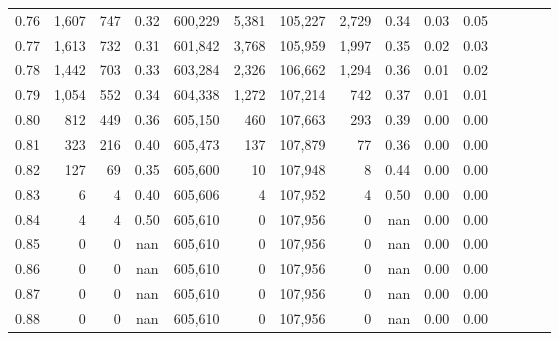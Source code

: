 \begin{tabular}{rrrcrrrrrrrrrrr}
0.76 &   1,607 &    747 &                                       0.32 &  600,229 &    5,381 &  105,227 &    2,729 &  0.34 &  0.03 &                         0.05 \\
0.77 &   1,613 &    732 &                                       0.31 &  601,842 &    3,768 &  105,959 &    1,997 &  0.35 &  0.02 &                         0.03 \\
0.78 &   1,442 &    703 &                                       0.33 &  603,284 &    2,326 &  106,662 &    1,294 &  0.36 &  0.01 &                         0.02 \\
0.79 &   1,054 &    552 &                                       0.34 &  604,338 &    1,272 &  107,214 &      742 &  0.37 &  0.01 &                         0.01 \\
0.80 &     812 &    449 &                                       0.36 &  605,150 &      460 &  107,663 &      293 &  0.39 &  0.00 &                         0.00 \\
0.81 &     323 &    216 &                                       0.40 &  605,473 &      137 &  107,879 &       77 &  0.36 &  0.00 &                         0.00 \\
0.82 &     127 &     69 &                                       0.35 &  605,600 &       10 &  107,948 &        8 &  0.44 &  0.00 &                         0.00 \\
0.83 &       6 &      4 &                                       0.40 &  605,606 &        4 &  107,952 &        4 &  0.50 &  0.00 &                         0.00 \\
0.84 &       4 &      4 &                                       0.50 &  605,610 &        0 &  107,956 &        0 &   nan &  0.00 &                         0.00 \\
0.85 &       0 &      0 &                                        nan &  605,610 &        0 &  107,956 &        0 &   nan &  0.00 &                         0.00 \\
0.86 &       0 &      0 &                                        nan &  605,610 &        0 &  107,956 &        0 &   nan &  0.00 &                         0.00 \\
0.87 &       0 &      0 &                                        nan &  605,610 &        0 &  107,956 &        0 &   nan &  0.00 &                         0.00 \\
0.88 &       0 &      0 &                                        nan &  605,610 &        0 &  107,956 &        0 &   nan &  0.00 &                         0.00 \\

\end{tabular}
